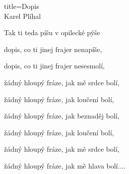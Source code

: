 \begin{song}{title=\predtitle\centering Dopis \\\large Karel Plíhal  \vspace*{-0.7cm}}
\begin{centerjustified}
	Tak ti teda píšu v opilecké pýše

	dopis, co ti jinej frajer nenapíše,

	dopis, co ti jinej frajer nesesmolí,

	žádný hloupý fráze, jak mě srdce bolí,

	žádný hloupý fráze, jak loučení bolí,

	žádný hloupý fráze, jak beznaděj bolí,

	žádný hloupý fráze, jak loučení bolí,

	žádný hloupý fráze, jak mě srdce bolí,

	žádný hloupý fráze, jak mě hlava bolí.\elipsa.\elipsa.\elipsa.
   


\end{centerjustified}
\setcounter{Slokočet}{0}
\end{song}
